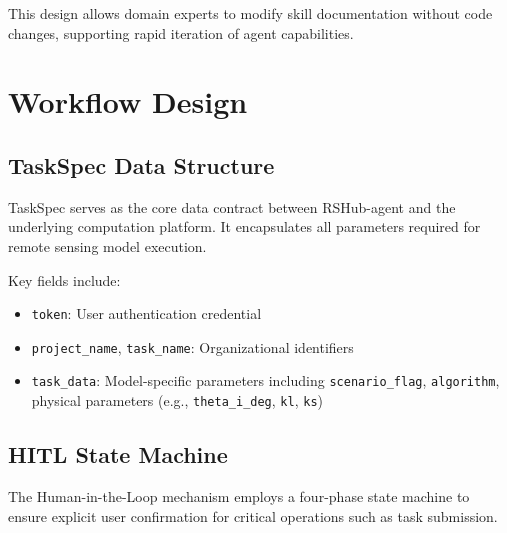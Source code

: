 This design allows domain experts to modify skill documentation without code changes, supporting rapid iteration of agent capabilities.

\section{Workflow Design}
\label{sec:workflow}

\subsection{TaskSpec Data Structure}

TaskSpec serves as the core data contract between RSHub-agent and the underlying computation platform. It encapsulates all parameters required for remote sensing model execution.

Key fields include:
\begin{itemize}
	\item \texttt{token}: User authentication credential
	\item \texttt{project\_name}, \texttt{task\_name}: Organizational identifiers
	\item \texttt{task\_data}: Model-specific parameters including \texttt{scenario\_flag}, \texttt{algorithm}, physical parameters (e.g., \texttt{theta\_i\_deg}, \texttt{kl}, \texttt{ks})
\end{itemize}

\subsection{HITL State Machine}

The Human-in-the-Loop mechanism employs a four-phase state machine to ensure explicit user confirmation for critical operations such as task submission.

